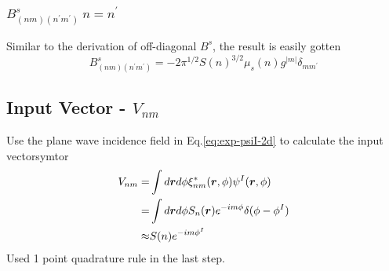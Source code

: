 \documentclass [10pt,letterpaper]{article}
\begin{document}
\subsubsection{$B^s_{(n m)(n^\prime m^\prime)} \ n=n^\prime$}
\label{subsub:Bsnmnpmp-diagonal}
Similar to the derivation of off-diagonal $B^s$, the result is easily gotten
\begin{equation} \label{eq:retsult-Bsnmnpmp-diagonal-1p}
	B^s_{(n m)(n^\prime m^\prime)}
	=
	-2 
	\pi^{1/2}
	S(n)^{3/2}
	\mu_s(n)g^{\lvert m\rvert} 
	\delta_{m m^\prime}
\end{equation}

\subsection{Input Vector - $V_{n m}$}
\label{input-vectorsymtor-Vnm}
Use the plane wave incidence field in Eq.\eqref{eq:exp-psiI-2d} to calculate the input vectorsymtor
\begin{equation} \label{eq:result-Vnm-1pt}
	\begin{split}
		V_{n m}
		=&
		\int d\vectorsym{r} d\phi
		\xi^*_{n m} (\vectorsym{r},\phi)
		\psi^I (\vectorsym{r},\phi)
		\\
		=&
		\int d\vectorsym{r} d\phi
		S_n(\vectorsym{r})
		e^{-i m \phi}
		\delta(\phi-\phi^I)
		\\
		\approx&
		S(n)e^{-i m \phi^I}
	\end{split}
\end{equation}
Used 1 point quadrature rule in the last step.
\end{document}
